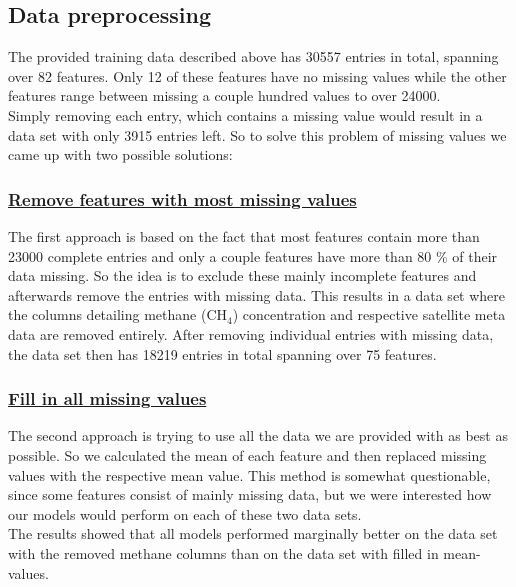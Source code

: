 \documentclass{article}
\begin{document}
\subsection{Data preprocessing}
The provided training data described above has 30557 entries in total, spanning over 82 features. Only 12 of these features have no missing values while the other features range between missing a couple hundred values to over 24000. \\
Simply removing each entry, which contains a missing value would result in a data set with only 3915 entries left. So to solve this problem of missing values we came up with two possible solutions:

\subsubsection{\href{https://github.com/tjayada/iANNwTF_Project/blob/main/data\%20preparation/05_finished_and_clean(1).ipynb}{Remove features with most missing values}}
The first approach is based on the fact that most features contain more than 23000 complete entries and only a couple features have more than 80 \% of their data missing. So the idea is to exclude these mainly incomplete features and afterwards remove the entries with missing data. This results in a data set where the columns detailing methane (CH$_4$) concentration and respective satellite meta data are removed entirely. After removing individual entries with missing data, the data set then has 18219 entries in total spanning over 75 features.

\subsubsection{\href{https://github.com/tjayada/iANNwTF_Project/blob/main/data\%20preparation/05_finished_and_clean(2).ipynb}{Fill in all missing values}}
The second approach is trying to use all the data we are provided with as best as possible. So we calculated the mean of each feature and then replaced missing values with the respective mean value. This method is somewhat questionable, since some features consist of mainly missing data, but we were interested how our models would perform on each of these two data sets.\\
The results showed that all models performed marginally better on the data set with the removed methane columns than on the data set with filled in mean-values.
\end{document}
